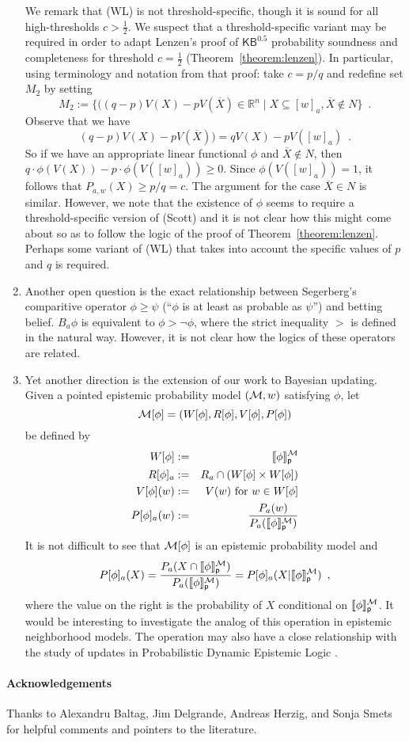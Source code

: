 \documentclass[12pt]{article}
\theoremstyle{definition}
\newcommand{\M}{{\cal M}}      %
\newcommand{\KBeq}{{\mathsf{KB}^{\mathsf{0.5}}}}       %
\newcommand{\semp}[1]{\llbracket{#1}\rrbracket_{\mathsf{p}}} %
\begin{document}
\begin{enumerate}
We remark that (WL) is not threshold-specific, though it is sound for
all high-thresholds $c>\frac 12$.  We suspect that a
threshold-specific variant may be required in order to adapt Lenzen's
proof of $\KBeq$ probability soundness and completeness for threshold
$c=\frac 12$ (Theorem~\ref{theorem:lenzen}).  In particular, using
terminology and notation from that proof: take $c=p/q$ and redefine
set $M_2$ by setting
\[
M_2:= \{((q-p) V(X)- p V(\overline X)\in\mathbb{R}^n\mid
X\subseteq[w]_a,\overline{X}\notin N\}\enspace.
\]
Observe that we have
\[
(q-p) V(X)- p V(\overline X)) =
qV(X)-pV([w]_a)\enspace.
\]
So if we have an appropriate linear functional $\phi$ and
$\overline{X}\notin N$, then
$q\cdot\phi(V(X))-p\cdot\phi(V([w]_a))\geq 0$.  Since
$\phi(V([w]_a))=1$, it follows that $P_{a,w}(X)\geq p/q=c$.  The
argument for the case $\overline{X}\in N$ is similar.  However, we
note that the existence of $\phi$ seems to require a
threshold-specific version of (Scott) and it is not clear how this might
come about so as to follow the logic of the proof of
Theorem~\ref{theorem:lenzen}.  Perhaps some variant of (WL) that takes
into account the specific values of $p$ and $q$ is required.

\item Another open question is the exact relationship between
  Segerberg's comparitive operator $\phi\geq\psi$ (``$\phi$ is at
  least as probable as $\psi$'') \cite{Segerberg1971:qpiams} and
  betting belief.  $B_a\phi$ is equivalent to $\phi>\lnot\phi$, where
  the strict inequality $>$ is defined in the natural way.  However,
  it is not clear how the logics of these operators are related.

\item Yet another direction is the extension of our work to Bayesian
  updating.  Given a pointed epistemic probability model $(\M,w)$
  satisfying $\phi$, let
\[
\M[\phi]=(W[\phi],R[\phi],V[\phi],P[\phi])
\]
be defined by
\begin{eqnarray*}
  W[\phi] &:=& \semp{\phi}^\M \\
  R[\phi]_a &:=& R_a \cap (W[\phi]\times W[\phi]) \\
  V[\phi](w) &:=& V(w) \text{ for } w\in W[\phi] \\
  P[\phi]_a(w) &:=&
    \frac{ P_a(w) }{ P_a(\semp{\phi}^\M) }
\end{eqnarray*}
It is not difficult to see that $\M[\phi]$ is an epistemic probability model and
\[
P[\phi]_a(X) =
\frac{ P_a(X\cap\semp{\phi}^\M) }{ P_a(\semp{\phi}^\M) } = 
P[\phi]_a(X|\semp{\phi}^\M)\enspace,
\]
where the value on the right is the probability of $X$ conditional on
$\semp{\phi}^\M$.  It would be interesting to investigate the analog
of this operation in epistemic neighborhood models.  The operation may
also have a close relationship with the study of updates in
Probabilistic Dynamic Epistemic Logic
\cite{BenGerKoo09:SL,BalSme08:Synt}.
\end{enumerate}

\paragraph{Acknowledgements} 

Thanks to Alexandru Baltag, Jim Delgrande, Andreas Herzig, and Sonja
Smets for helpful comments and pointers to the literature.


  
\end{document}
